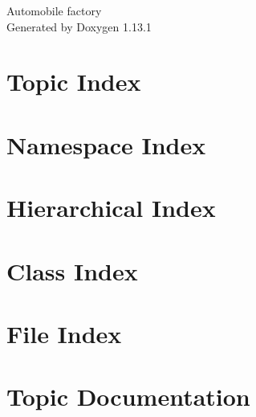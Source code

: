 \documentclass[twoside]{book}
\newcommand{\+}{\discretionary{\mbox{\scriptsize$\hookleftarrow$}}{}{}}
\newcommand{\clearemptydoublepage}{%
    \newpage{\pagestyle{empty}\cleardoublepage}%
  }
\begin{document}
  \raggedbottom
    \hypersetup{pageanchor=false,
                bookmarksnumbered=true,
                pdfencoding=unicode
               }
  \begin{titlepage}
  \vspace*{7cm}
  \begin{center}%
  {\Large Automobile factory}\\
  \vspace*{1cm}
  {\large Generated by Doxygen 1.13.1}\\
  \end{center}
  \end{titlepage}
  \clearemptydoublepage
  \tableofcontents
  \clearemptydoublepage
  \hypersetup{pageanchor=true}






\chapter{Topic Index}

\chapter{Namespace Index}

\chapter{Hierarchical Index}

\chapter{Class Index}

\chapter{File Index}

\chapter{Topic Documentation}







\end{document}
